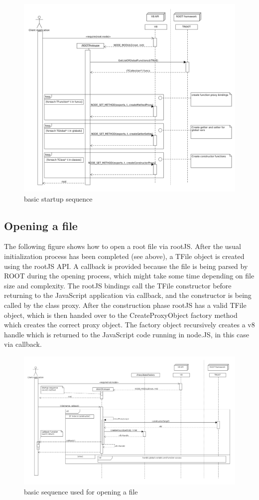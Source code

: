 \begin{figure}[htb]
	\centering
	\includegraphics[width=18cm]{./latex/resources/startupSequence.png}
	\caption{basic startup sequence}
\end{figure}
\pagebreak



\subsection{Opening a file}
The following figure shows how to open a root file via rootJS. After the usual initialization process has been completed (see above), a TFile object is created using the rootJS API. A callback is provided because the file is being parsed by ROOT during the opening process, which might take some time depending on file size and complexity. The rootJS bindings call the TFile constructor before returning to the JavaScript application via callback, and the constructor is being called by the class proxy. After the construction phase rootJS has a valid TFile object, which is then handed over to the CreateProxyObject factory method which creates the correct proxy object. The factory object recursively creates a v8 handle which is returned to the JavaScript code running in node.JS, in this case via callback.

\begin{figure}[htb]
	\centering
	\includegraphics[width=18cm]{./latex/resources/fileOpen.png}
	\caption{basic sequence used for opening a file}
\end{figure}
